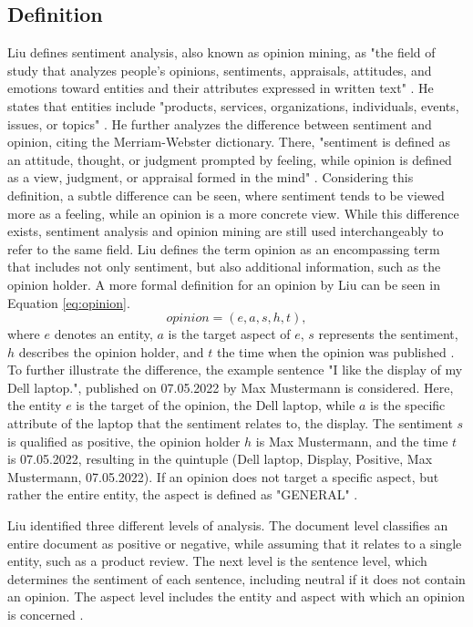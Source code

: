 
\subsection{Definition}


Liu defines sentiment analysis, also known as opinion mining, as "the field of study that analyzes people's opinions, sentiments, appraisals, attitudes, and emotions toward entities and their attributes expressed in written text" \cite[p.~1]{liu_2015}. He states that entities include "products, services, organizations, individuals, events, issues, or topics" \cite[p.~1]{liu_2015}. He further analyzes the difference between sentiment and opinion, citing the Merriam-Webster dictionary. There, "sentiment is defined as an attitude, thought, or judgment prompted by feeling, while opinion is defined as a view, judgment, or appraisal formed in the mind" \cite[p.~2]{liu_2015}. Considering this definition, a subtle difference can be seen, where sentiment tends to be viewed more as a feeling, while an opinion is a more concrete view. While this difference exists, sentiment analysis and opinion mining are still used interchangeably to refer to the same field. Liu defines the term opinion as an encompassing term that includes not only sentiment, but also additional information, such as the opinion holder. A more formal definition for an opinion by Liu can be seen in Equation \eqref{eq:opinion}.
\begin{equation}
    opinion = (e, a, s, h, t),
    \label{eq:opinion}
\end{equation}
where $e$ denotes an entity, $a$ is the target aspect of $e$, $s$ represents the sentiment, $h$ describes the opinion holder, and $t$ the time when the opinion was published \cite{liu_2015}. To further illustrate the difference, the example sentence "I like the display of my Dell laptop.", published on 07.05.2022 by Max Mustermann is considered. Here, the entity $e$ is the target of the opinion, the Dell laptop, while $a$ is the specific attribute of the laptop that the sentiment relates to, the display. The sentiment $s$ is qualified as positive, the opinion holder $h$ is Max Mustermann, and the time $t$ is 07.05.2022, resulting in the quintuple (Dell laptop, Display, Positive, Max Mustermann, 07.05.2022). If an opinion does not target a specific aspect, but rather the entire entity, the aspect is defined as "GENERAL" \cite{liu_2015}. 


Liu identified three different levels of analysis. The document level classifies an entire document as positive or negative, while assuming that it relates to a single entity, such as a product review. The next level is the sentence level, which determines the sentiment of each sentence, including neutral if it does not contain an opinion. The aspect level includes the entity and aspect with which an opinion is concerned \cite{liu_2015}.

